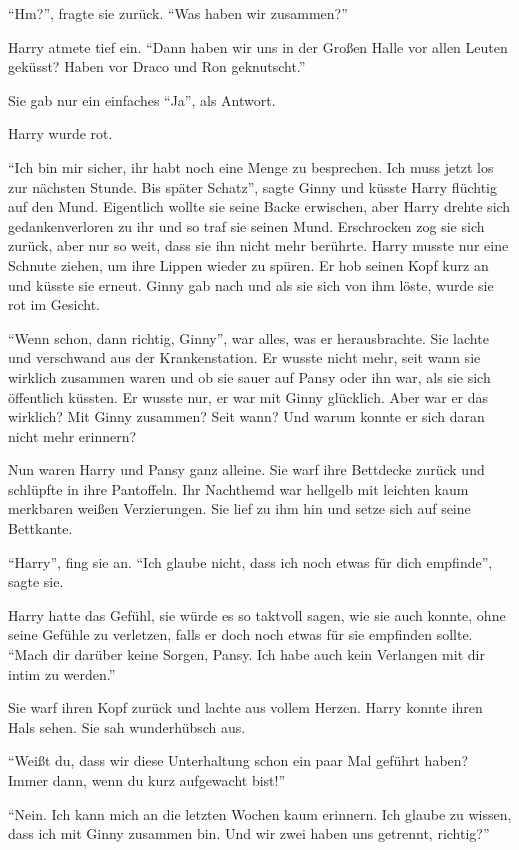 \enquote{Hm?}, fragte sie zurück. \enquote{Was haben wir zusammen?}

Harry atmete tief ein. \enquote{Dann haben wir uns in der Großen Halle vor allen Leuten geküsst? Haben vor Draco und Ron geknutscht.}

Sie gab nur ein einfaches \enquote{Ja}, als Antwort.

Harry wurde rot.

\enquote{Ich bin mir sicher, ihr habt noch eine Menge zu besprechen. Ich muss jetzt los zur nächsten Stunde. Bis später Schatz}, sagte Ginny und küsste Harry flüchtig auf den Mund. Eigentlich wollte sie seine Backe erwischen, aber Harry drehte sich gedankenverloren zu ihr und so traf sie seinen Mund. Erschrocken zog sie sich zurück, aber nur so weit, dass sie ihn nicht mehr berührte. Harry musste nur eine Schnute ziehen, um ihre Lippen wieder zu spüren. Er hob seinen Kopf kurz an und küsste sie erneut. Ginny gab nach und als sie sich von ihm löste, wurde sie rot im Gesicht.

\enquote{Wenn schon, dann richtig, Ginny}, war alles, was er herausbrachte. Sie lachte und verschwand aus der Krankenstation. Er wusste nicht mehr, seit wann sie wirklich zusammen waren und ob sie sauer auf Pansy oder ihn war, als sie sich öffentlich küssten. Er wusste nur, er war mit Ginny glücklich. Aber war er das wirklich? Mit Ginny zusammen? Seit wann? Und warum konnte er sich daran nicht mehr erinnern?

Nun waren Harry und Pansy ganz alleine. Sie warf ihre Bettdecke zurück und schlüpfte in ihre Pantoffeln. Ihr Nachthemd war hellgelb mit leichten kaum merkbaren weißen Verzierungen. Sie lief zu ihm hin und setze sich auf seine Bettkante.

\enquote{Harry}, fing sie an. \enquote{Ich glaube nicht, dass ich noch etwas für dich empfinde}, sagte sie.

Harry hatte das Gefühl, sie würde es so taktvoll sagen, wie sie auch konnte, ohne seine Gefühle zu verletzen, falls er doch noch etwas für sie empfinden sollte. \enquote{Mach dir darüber keine Sorgen, Pansy. Ich habe auch kein Verlangen mit dir \gst intim zu werden.}

Sie warf ihren Kopf zurück und lachte aus vollem Herzen. Harry konnte ihren Hals sehen. Sie sah wunderhübsch aus.

\enquote{Weißt du, dass wir diese Unterhaltung schon ein paar Mal geführt haben? Immer dann, wenn du kurz aufgewacht bist!}

\enquote{Nein. Ich kann mich an die letzten Wochen kaum erinnern. Ich glaube zu wissen, dass ich mit Ginny zusammen bin. Und wir zwei haben uns getrennt, richtig?}

